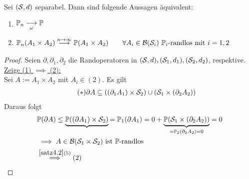 \begin{theorem}\label{theorem4.19}
Sei $(\S,d)$ separabel. Dann sind folgende Aussagen äquivalent:
\begin{enumerate}[label=(\arabic*)]
\item $\begin{aligned}
\P_n\stackrelnew{\omega}{}{\longrightarrow} \P 
\end{aligned}$
\item $\begin{aligned}
\P_n(A_1\times A_2)\stackrel{n\to\infty}{\longrightarrow} \P(A_1\times A_2)\qquad\forall A_i\in\B(\S_i)~\P_i\text{-randlos mit } i=1,2
\end{aligned}$
\end{enumerate}
\end{theorem}
\begin{proof}
Seien $\partial,\partial_1,\partial_2$ die Randoperatoren in $(\S,d),(\S_1,d_1),(\S_2,d_2)$, respektive.\nl
\underline{Zeige (1) $\implies$ (2):}\\
Sei $A:=A_1\times A_2$ mit $A_i\in(2)$. Es gilt
\begin{align}\label{eqProof4.19Stern}\tag{$\ast$}
\partial A\subseteq((\partial_1 A_1)\times\S_2)\cup(\S_1\times(\partial_2 A_2))
\end{align}
Daraus folgt
\begin{align*}
&\P(\partial A)\leq \underbrace{\P((\partial A_1)\times\S_2)}{=\P_1(\partial A_1)=0}+\underbrace{\P(\S_1\times(\partial_2 A_2))}_ {=\P_2(\partial_2 A_2)=0}=0\\
&\implies
A\in\B(\S_1\times\S_2)\text{ ist $\P$-randlos}\\
&\stackrel{\ref{satz4.2}(5)}{\implies}(2)
\end{align*}


\end{proof}
